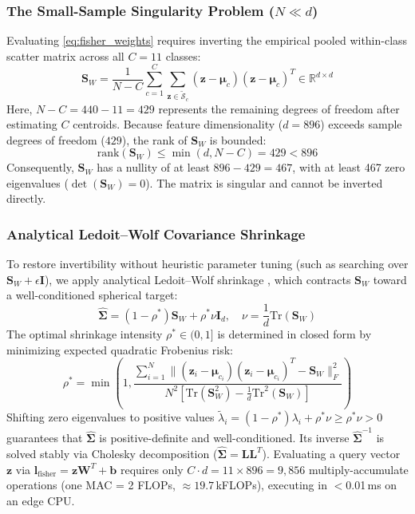 \documentclass[preprint,12pt]{elsarticle}
\begin{document}
\subsubsection{The Small-Sample Singularity Problem ($N \ll d$)}
Evaluating \eqref{eq:fisher_weights} requires inverting the empirical pooled within-class scatter matrix across all $C=11$ classes:
\begin{equation}
    \mathbf{S}_W = \frac{1}{N - C}\sum_{c=1}^C \sum_{\mathbf{z} \in \tilde{\mathcal{S}}_c} (\mathbf{z} - \boldsymbol{\mu}_c)(\mathbf{z} - \boldsymbol{\mu}_c)^T \in \mathbb{R}^{d \times d}
\end{equation}
Here, $N - C = 440 - 11 = 429$ represents the remaining degrees of freedom after estimating $C$ centroids. Because feature dimensionality ($d=896$) exceeds sample degrees of freedom ($429$), the rank of $\mathbf{S}_W$ is bounded:
\begin{equation}
    \text{rank}(\mathbf{S}_W) \le \min(d, N - C) = 429 < 896
\end{equation}
Consequently, $\mathbf{S}_W$ has a nullity of at least $896 - 429 = 467$, with at least 467 zero eigenvalues ($\det(\mathbf{S}_W) = 0$). The matrix is singular and cannot be inverted directly.

\subsubsection{Analytical Ledoit--Wolf Covariance Shrinkage}
\label{sec:shrinkage}
To restore invertibility without heuristic parameter tuning (such as searching over $\mathbf{S}_W + \epsilon \mathbf{I}$), we apply analytical Ledoit--Wolf shrinkage \cite{ledoit2004well}, which contracts $\mathbf{S}_W$ toward a well-conditioned spherical target:
\begin{equation}
    \hat{\mathbf{\Sigma}} = (1 - \rho^*)\mathbf{S}_W + \rho^* \nu \mathbf{I}_{d}, \quad \nu = \frac{1}{d}\text{Tr}(\mathbf{S}_W)
    \label{eq:lw_target}
\end{equation}
The optimal shrinkage intensity $\rho^* \in (0, 1]$ is determined in closed form by minimizing expected quadratic Frobenius risk:
\begin{equation}
    \rho^* = \min\left(1, \frac{\sum_{i=1}^N \|(\mathbf{z}_i - \boldsymbol{\mu}_{c_i})(\mathbf{z}_i - \boldsymbol{\mu}_{c_i})^T - \mathbf{S}_W\|_F^2}{N^2 \left[\text{Tr}(\mathbf{S}_W^2) - \frac{1}{d}\text{Tr}^2(\mathbf{S}_W)\right]}\right)
    \label{eq:lw_shrinkage}
\end{equation}
Shifting zero eigenvalues to positive values $\tilde{\lambda}_i = (1 - \rho^*)\lambda_i + \rho^* \nu \ge \rho^* \nu > 0$ guarantees that $\hat{\mathbf{\Sigma}}$ is positive-definite and well-conditioned. Its inverse $\hat{\mathbf{\Sigma}}^{-1}$ is solved stably via Cholesky decomposition ($\hat{\mathbf{\Sigma}} = \mathbf{L}\mathbf{L}^T$). Evaluating a query vector $\mathbf{z}$ via $\mathbf{l}_{\text{fisher}} = \mathbf{z}\mathbf{W}^T + \mathbf{b}$ requires only $C \cdot d = 11 \times 896 = 9{,}856$ multiply-accumulate operations (one MAC = 2 FLOPs, $\approx 19.7$\,kFLOPs), executing in $<$0.01\,ms on an edge CPU.
\end{document}
